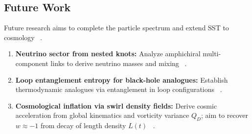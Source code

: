 \documentclass[10pt,reprint,aps,onecolumn,nofootinbib]{revtex4-2}
\begin{document}
        \subsection*{Future Work}
            Future research aims to complete the particle spectrum and extend SST to cosmology~ \cite{sstCanon}.
            \begin{enumerate}
                \item \textbf{Neutrino sector from nested knots:} Analyze amphichiral multi-component links to derive neutrino masses and mixing~ \cite{sstLagrangian}.
                \item \textbf{Loop entanglement entropy for black-hole analogues:} Establish thermodynamic analogues via entanglement in loop configurations~ \cite{sstCanon}.
                \item \textbf{Cosmological inflation via swirl density fields:} Derive cosmic acceleration from global kinematics and vorticity variance $Q_D$; aim to recover $w \approx -1$ from decay of length density $L(t)$~ \cite{sstCanon}.
            \end{enumerate}
\end{document}
